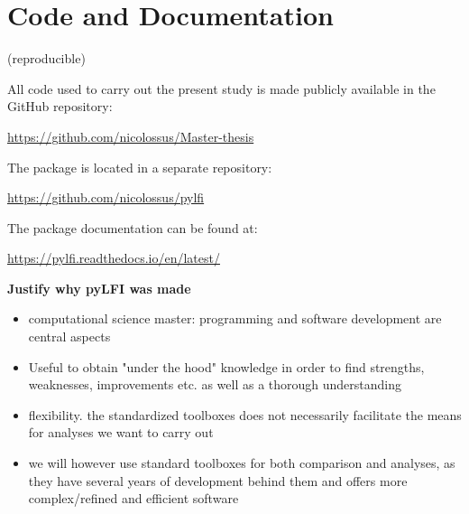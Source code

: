 \section{Code and Documentation}

(reproducible)

All code used to carry out the present study is made publicly available in the GitHub repository:

\begin{center}
    \url{https://github.com/nicolossus/Master-thesis}
\end{center}


The  package is located in a separate repository:

\begin{center}
    \url{https://github.com/nicolossus/pylfi}
\end{center}

The  package documentation can be found at:

\begin{center}
    \url{https://pylfi.readthedocs.io/en/latest/}
\end{center}


\textbf{Justify why pyLFI was made} 

\begin{itemize}
    \item computational science master: programming and software development are central aspects
    \item Useful to obtain "under the hood" knowledge in order to find strengths, weaknesses, improvements etc. as well as a thorough understanding 
    \item flexibility. the standardized toolboxes does not necessarily facilitate the means for analyses we want to carry out 
    \item we will however use standard toolboxes for both comparison and analyses, as they have several years of development behind them and offers more complex/refined and efficient software
\end{itemize} 

